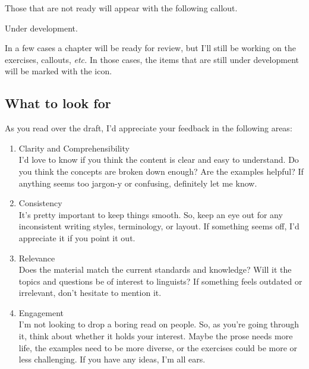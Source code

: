 \documentclass[
  letterpaper,
  DIV=11,
  numbers=noendperiod]{scrreport}
\theoremstyle{definition}
\theoremstyle{remark}
\begin{document}
Those that are not ready will appear with the following callout.

\begin{tcolorbox}[enhanced jigsaw, title=\textcolor{quarto-callout-caution-color}{\faFire}\hspace{0.5em}{Caution}, left=2mm, breakable, toptitle=1mm, colback=white, leftrule=.75mm, toprule=.15mm, coltitle=black, colframe=quarto-callout-caution-color-frame, colbacktitle=quarto-callout-caution-color!10!white, bottomtitle=1mm, opacityback=0, titlerule=0mm, rightrule=.15mm, opacitybacktitle=0.6, bottomrule=.15mm, arc=.35mm]

Under development.

\end{tcolorbox}

In a few cases a chapter will be ready for review, but I'll still be
working on the exercises, callouts, \emph{etc.} In those cases, the
items that are still under development will be marked with the
 icon.

\hypertarget{what-to-look-for}{%
\subsection*{What to look for}\label{what-to-look-for}}

As you read over the draft, I'd appreciate your feedback in the
following areas:

\begin{enumerate}
\def\labelenumi{\arabic{enumi}.}
\item
  Clarity and Comprehensibility\\
  I'd love to know if you think the content is clear and easy to
  understand. Do you think the concepts are broken down enough? Are the
  examples helpful? If anything seems too jargon-y or confusing,
  definitely let me know.
\item
  Consistency\\
  It's pretty important to keep things smooth. So, keep an eye out for
  any inconsistent writing styles, terminology, or layout. If something
  seems off, I'd appreciate it if you point it out.
\item
  Relevance\\
  Does the material match the current standards and knowledge? Will it
  the topics and questions be of interest to linguists? If something
  feels outdated or irrelevant, don't hesitate to mention it.
\item
  Engagement\\
  \hspace{0pt}I\hspace{0pt}'m not looking to drop a boring read on
  people. So, as you're going through it, think about whether it holds
  your interest. Maybe \hspace{0pt}the prose needs more life, the
  examples need to be more diverse, or the exercises could be more or
  less challenging. If you have any ideas, I'm all ears.
\end{enumerate}
\end{document}
